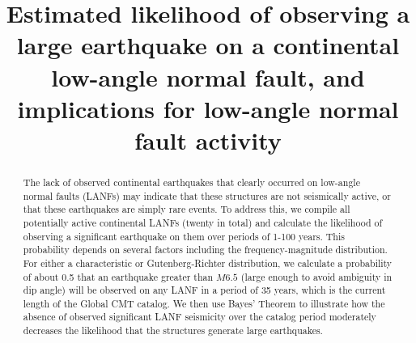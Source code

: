 \documentclass[draft,grl]{AGUTeX}
\begin{document}
\title{Estimated likelihood of observing a large earthquake on a continental 
	   low-angle normal fault, and implications for low-angle normal fault
       activity}



\begin{abstract}
The lack of observed continental earthquakes that clearly occurred on low-angle
normal faults (LANFs) may indicate that these structures are not seismically
active, or that these earthquakes are simply rare events. To address this, we
compile all potentially active continental LANFs (twenty in total) and
calculate the likelihood of observing a significant earthquake on them over
periods of 1-100 years. This probability depends on several factors including
the frequency-magnitude distribution. For either a characteristic or
Gutenberg-Richter distribution, we calculate a probability of about 0.5 that an
earthquake greater than $M6.5$ (large enough to avoid ambiguity in dip angle)
will be observed on any LANF in a period of 35 years, which is the current
length of the Global CMT catalog. We then use Bayes' Theorem to illustrate how
the absence of observed significant LANF seismicity over the catalog period
moderately decreases the likelihood that the structures generate large
earthquakes.


\end{abstract}
\end{document}
